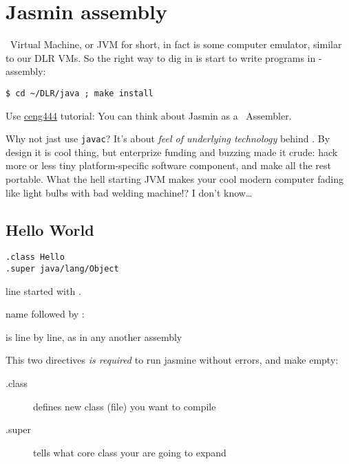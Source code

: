 \section{Jasmin assembly}

\noindent
\J\ Virtual Machine, or JVM for short, in fact is some computer emulator,
similar to our DLR VMs. So the right way to dig in is start to write programs in
\J-assembly:

\begin{lstlisting}
$ cd ~/DLR/java ; make install
\end{lstlisting}
Use
\href{http://saksagan.ceng.metu.edu.tr/courses/ceng444/link/f3jasmintutorial.html}{ceng444} tutorial:
You can think about Jasmin as a \J\ Assembler.

\medskip\noindent
Why not jast use \verb|javac|? It's about \emph{feel of underlying technology}
behind \J. By design it is cool thing, but enterprize funding and buzzing made
it crude: hack more or less tiny platform-specific software component, and make
all the rest portable. What the hell starting JVM makes your cool modern
computer fading like light bulbs with bad welding machine!? I don't know\ldots

\clearpage
\subsection{Hello World}

\begin{lstlisting}
.class Hello
.super java/lang/Object
\end{lstlisting}

\begin{description}[nosep]
\item[directive] line started with .
\item[label] name followed by :
\item[instruction] is line by line, as in any another assembly
\end{description}

\medskip\noindent This two directives \emph{is required} to run jasmine without
errors, and make empty:
\begin{description}
\item[.class] defines new class (file) you want to compile
\item[.super] tells what core class your are going to expand
\end{description}

